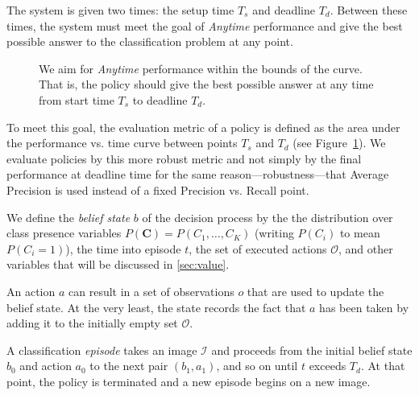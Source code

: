 \documentclass[runningheads]{llncs}
\begin{document}
The system is given two times: the setup time $T_s$ and deadline $T_d$.
Between these times, the system must meet the goal of \emph{Anytime} performance and give the best possible answer to the classification problem at any point.

\begin{figure}[h!]
  \caption{We aim for \emph{Anytime} performance within the bounds of the curve. That is, the policy should give the best possible answer at any time from start time $T_s$ to deadline $T_d$.}
  \label{fig:evaluation}
\end{figure}

To meet this goal, the evaluation metric of a policy is defined as the area under the performance vs. time curve between points $T_s$ and $T_d$ (see Figure~\ref{fig:evaluation}).
We evaluate policies by this more robust metric and not simply by the final performance at deadline time for the same reason---robustness---that Average Precision is used instead of a fixed Precision vs. Recall point.

We define the \emph{belief state} $b$ of the decision process by the the distribution over class presence variables $P(\mathbf{C}) = P(C_1, \dots, C_K)$ (writing $P(C_i)$ to mean $P(C_i=1)$), the time into episode $t$, the set of executed actions $\mathcal{O}$, and other variables that will be discussed in \autoref{sec:value}.

An action $a$ can result in a set of observations $o$ that are used to update the belief state.
At the very least, the state records the fact that $a$ has been taken by adding it to the initially empty set $\mathcal{O}$.

A classification \emph{episode} takes an image $\mathcal{I}$ and proceeds from the initial belief state $b_0$ and action $a_0$ to the next pair $(b_1,a_1)$, and so on until $t$ exceeds $T_d$.
At that point, the policy is terminated and a new episode begins on a new image.
\end{document}
